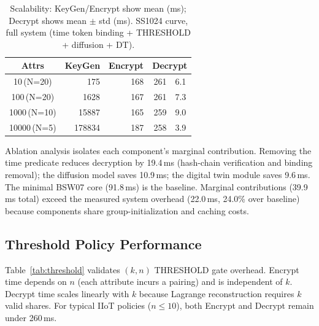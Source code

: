 ﻿\documentclass[lettersize,journal]{IEEEtran}
\begin{document}
\begin{table}[!t]
\renewcommand{\arraystretch}{1.1}
\caption{Scalability: KeyGen/Encrypt show mean (ms); Decrypt shows mean $\pm$ std (ms).
SS1024 curve, full system (time token binding + THRESHOLD + diffusion + DT).}
\label{tab:scalability}
\centering
\footnotesize
\begin{tabular}{c r r r@{$\pm$}l}
\toprule
\textbf{Attrs} & \textbf{KeyGen} & \textbf{Encrypt} & \multicolumn{2}{c}{\textbf{Decrypt}} \\
\midrule
10\,(N=20) & 175 & 168 & 261 & 6.1 \\
100\,(N=20) & 1628 & 167 & 261 & 7.3 \\
1000\,(N=10) & 15887 & 165 & 259 & 9.0 \\
10000\,(N=5) & 178834 & 187 & 258 & 3.9 \\
\bottomrule
\end{tabular}
\end{table}

Ablation analysis isolates each component's marginal contribution.
Removing the time predicate reduces decryption by 19.4\,ms (hash-chain
verification and binding removal); the diffusion model saves 10.9\,ms;
the digital twin module saves 9.6\,ms. The minimal BSW07 core (91.8\,ms)
is the baseline. Marginal contributions (39.9\,ms total) exceed the
measured system overhead (22.0\,ms, 24.0\% over baseline) because
components share group-initialization and caching costs.

\subsection{Threshold Policy Performance}
\label{subsec:threshold_perf}

Table~\ref{tab:threshold} validates $(k,n)$ THRESHOLD gate overhead.
Encrypt time depends on $n$ (each attribute incurs a pairing) and is
independent of $k$. Decrypt time scales linearly with $k$ because
Lagrange reconstruction requires $k$ valid shares. For typical IIoT
policies ($n \leq 10$), both Encrypt and Decrypt remain under 260\,ms.
\end{document}
